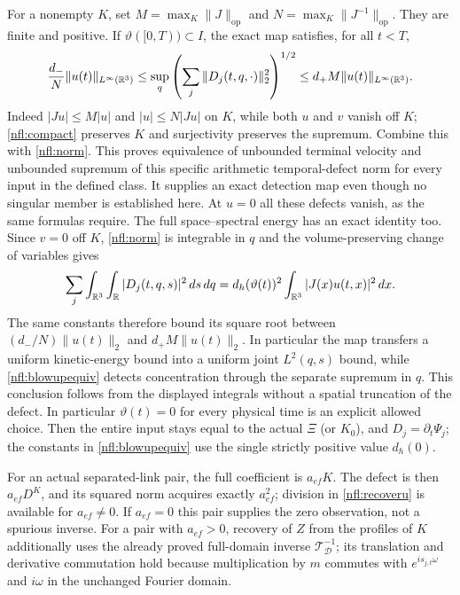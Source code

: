 For a nonempty $K$, set
$M=\max_K\|J\|_{\mathrm{op}}$ and
$N=\max_K\|J^{-1}\|_{\mathrm{op}}$. They are finite and positive.
If $\vartheta([0,T))\subset I$, the exact map satisfies, for all $t<T$,
\begin{equation}
 \frac{d_-}{N}\|u(t)\|_{L^\infty(\mathbb R^3)}
 \leq \sup_q\left(\sum_j\|D_j(t,q,\cdot)\|_2^2\right)^{1/2}
 \leq d_+M\|u(t)\|_{L^\infty(\mathbb R^3)}.
 \label{nfl:blowupequiv}
\end{equation}
Indeed $|Ju|\leq M|u|$ and $|u|\leq N|Ju|$ on $K$, while both $u$
and $v$ vanish off $K$; \eqref{nfl:compact} preserves $K$ and
surjectivity preserves the supremum. Combine this with \eqref{nfl:norm}.
This proves equivalence of unbounded terminal velocity and unbounded
supremum of this specific arithmetic temporal-defect norm for every
input in the defined class. It supplies an exact detection map even
though no singular member is established here. At $u=0$ all these
defects vanish, as the same formulas require.
The full space--spectral energy has an exact identity too. Since $v=0$
off $K$, \eqref{nfl:norm} is integrable in $q$ and the volume-preserving
change of variables gives
\[
 \sum_j\int_{\mathbb R^3}\int_\mathbb R|D_j(t,q,s)|^2\,ds\,dq
   =d_h(\vartheta(t))^2\int_{\mathbb R^3}|J(x)u(t,x)|^2\,dx.
\]
The same constants therefore bound its square root between
$(d_-/N)\|u(t)\|_2$ and $d_+M\|u(t)\|_2$. In particular the map
transfers a uniform kinetic-energy bound into a uniform joint
$L^2(q,s)$ bound, while \eqref{nfl:blowupequiv} detects concentration
through the separate supremum in $q$. This conclusion follows from the
displayed integrals without a spatial truncation of the defect.
In particular $\vartheta(t)=0$ for every physical time is an explicit
allowed choice. Then the entire input stays equal to the actual
$\Xi$ (or $K_0$), and $D_j=\partial_t\Psi_j$; the constants in
\eqref{nfl:blowupequiv} use the single strictly positive value $d_h(0)$.

For an actual separated-link pair, the full coefficient is $a_{ef}K$.
The defect is then $a_{ef}D^K$, and its squared norm acquires exactly
$a_{ef}^2$; division in \eqref{nfl:recoveru} is available for
$a_{ef}\ne0$. If $a_{ef}=0$ this pair supplies the zero observation,
not a spurious inverse. For a pair with $a_{ef}>0$, recovery of $Z$ from
the profiles of $K$ additionally uses the already proved full-domain
inverse $\mathcal T_{\mathcal D}^{-1}$; its translation and derivative
commutation hold because multiplication by $m$ commutes with
$e^{is_{j,t}\omega}$ and $i\omega$ in the unchanged Fourier domain.

